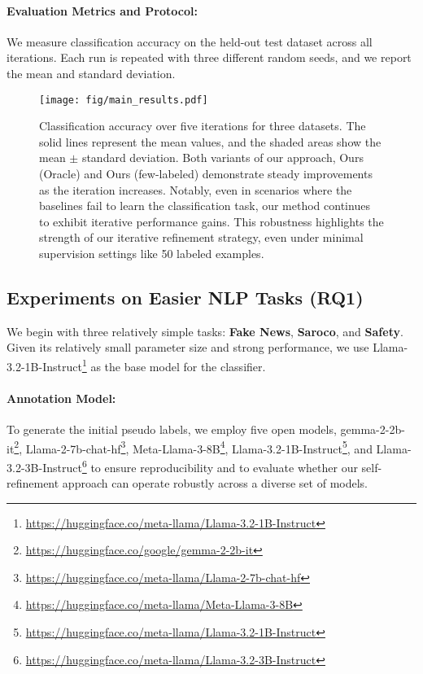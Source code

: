 \paragraph{Evaluation Metrics and Protocol:}
We measure classification accuracy on the held-out test dataset across all iterations. Each run is repeated with three different random seeds, and we report the mean and standard deviation.

\begin{figure*}[h]
    \centering
    \texttt{[image: fig/main\_results.pdf]}
    \caption{Classification accuracy over five iterations for three datasets. The solid lines represent the mean values, and the shaded areas show the mean $\pm$ standard deviation. Both variants of our approach, Ours (Oracle) and Ours (few-labeled) demonstrate steady improvements as the iteration increases. Notably, even in scenarios where the baselines fail to learn the classification task, our method continues to exhibit iterative performance gains. This robustness highlights the strength of our iterative refinement strategy, even under minimal supervision settings like 50 labeled examples.}
    \label{fig:main}
\end{figure*}

\subsection{Experiments on Easier NLP Tasks (RQ1)}
\label{subsec:easy_result}
We begin with three relatively simple tasks: \textbf{Fake News}, \textbf{Saroco}, and \textbf{Safety}. Given its relatively small parameter size and strong performance, we use Llama-3.2-1B-Instruct\footnote{\scriptsize\url{https://huggingface.co/meta-llama/Llama-3.2-1B-Instruct}} as the base model for the classifier.

\paragraph{Annotation Model:}
To generate the initial pseudo labels, we employ five open models, gemma-2-2b-it\footnote{\scriptsize\url{https://huggingface.co/google/gemma-2-2b-it}}, Llama-2-7b-chat-hf\footnote{\scriptsize\url{https://huggingface.co/meta-llama/Llama-2-7b-chat-hf}}, Meta-Llama-3-8B\footnote{\scriptsize\url{https://huggingface.co/meta-llama/Meta-Llama-3-8B}}, Llama-3.2-1B-Instruct\footnote{\scriptsize\url{https://huggingface.co/meta-llama/Llama-3.2-1B-Instruct}}, and Llama-3.2-3B-Instruct\footnote{\scriptsize\url{https://huggingface.co/meta-llama/Llama-3.2-3B-Instruct}} to ensure reproducibility and to evaluate whether our self-refinement approach can operate robustly across a diverse set of models.

